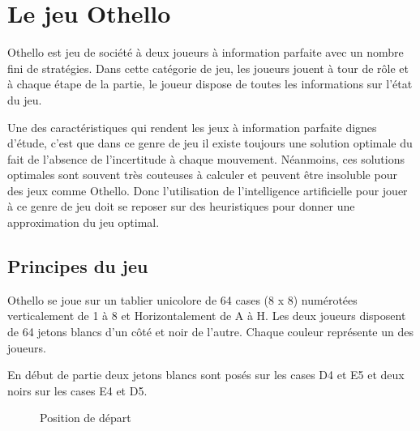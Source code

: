 \documentclass[11pt]{article}
\begin{document}
\section{Le jeu Othello}

Othello est jeu de société à deux joueurs à information
parfaite avec un nombre fini de stratégies. Dans cette catégorie de
jeu, les joueurs jouent à tour de rôle et à chaque étape de la
partie, le joueur dispose de toutes les informations sur l'état du jeu.

Une des caractéristiques qui rendent les jeux à information parfaite
dignes d'étude, c'est que dans ce genre de jeu il existe toujours une
solution optimale du fait de l'absence de l'incertitude à chaque
mouvement. Néanmoins, ces solutions optimales sont souvent très
couteuses à calculer et peuvent être insoluble pour des jeux comme
Othello. Donc l'utilisation de l'intelligence artificielle pour jouer à ce
genre de jeu doit se reposer sur des heuristiques pour donner une
approximation du jeu optimal.

\subsection{Principes du jeu}

Othello se joue sur un tablier unicolore de 64 cases (8 x 8)
numérotées verticalement de 1 à 8 et Horizontalement de A à H.
Les deux joueurs disposent de 64 jetons blancs d'un côté et noir de
l'autre. Chaque couleur représente un des joueurs.

En début de partie deux jetons blancs sont posés sur les cases D4 et
E5 et deux noirs sur les cases E4 et D5.





\begin{figure}[h]
  \caption{Position de départ}
  
    \noindent{}  
\end{figure}
\end{document}
